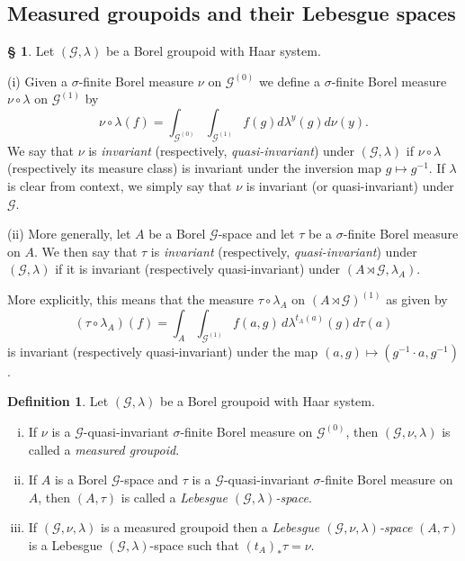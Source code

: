 \documentclass[11pt, oneside]{amsart}
\theoremstyle{definition}
\newtheorem{defn}[lemma]{Definition}
\newtheorem{no}[lemma]{\S}
\theoremstyle{remark}
\theoremstyle{TheoremNum}
\newcommand{\cG}{\mathcal{G}}
\begin{document}
\subsection{Measured groupoids and their Lebesgue spaces}\label{sec2.3}
\begin{no} Let $(\cG,\lambda)$ be a Borel groupoid with Haar system.

\item (i) Given a $\sigma$-finite Borel measure $\nu$ on $\cG^{(0)}$ we define a $\sigma$-finite Borel measure $\nu \circ \lambda$ on $\cG^{(1)}$ by
  \[\nu\circ\lambda(f)=\int_{\mathcal{G}^{(0)}} \int_{\mathcal{G}^{(1)}} f(g)d\lambda^y(g)d\nu(y).\]
We say that $\nu$ is \emph{invariant} (respectively, \emph{quasi-invariant}) under $(\cG, \lambda)$ if $\nu\circ\lambda$ (respectively its measure class) is invariant under the inversion map $g \mapsto g^{-1}$. If $\lambda$ is clear from context, we simply say that $\nu$ is invariant (or quasi-invariant) under $\cG$.
  
  \item (ii) More generally, let $A$ be a Borel $\cG$-space and let $\tau$ be a $\sigma$-finite Borel measure on $A$. We then  say that $\tau$ is \emph{invariant} (respectively, \emph{quasi-invariant}) under $(\cG, \lambda)$ if it is invariant (respectively quasi-invariant) under $(A \rtimes \cG, \lambda_A)$. 
  
  More explicitly, this means that the measure $\tau \circ \lambda_A$ on $(A \rtimes \cG)^{(1)}$ as given by 
  \[
 ( \tau \circ \lambda_A)(f) = \int_A \int_{\cG^{(1)}} f(a,g) \, d \lambda^{t_A(a)}(g) d \tau(a)
  \]
  is invariant (respectively quasi-invariant) under the map $(a,g) \mapsto (g^{-1} \cdot a, g^{-1})$.
\end{no}
\begin{defn} Let $(\cG, \lambda)$ be a Borel groupoid with Haar system.
\begin{enumerate}[(i)]
\item If $\nu$ is a $\cG$-quasi-invariant $\sigma$-finite Borel measure on $\cG^{(0)}$, then $(\cG, \nu, \lambda)$ is called a \emph{measured groupoid}.
\item If $A$ is a Borel $\cG$-space and $\tau$ is a $\cG$-quasi-invariant $\sigma$-finite Borel measure on $A$, then $(A, \tau)$ is called a \emph{Lebesgue $(\cG, \lambda)$-space}.
\item If $(\cG, \nu, \lambda)$ is a measured groupoid then a \emph{Lebesgue $(\cG, \nu, \lambda)$-space} $(A, \tau)$ is a Lebesgue $(\cG, \lambda)$-space such that $(t_A)_*\tau = \nu$.
\end{enumerate}
\end{defn}
\end{document}
